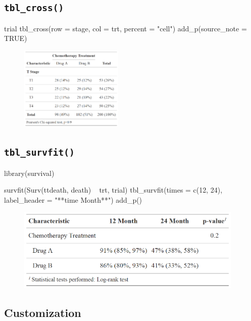 \subsection{\texorpdfstring{\texttt{tbl\_cross()}}{tbl\_cross()}}

\begin{example}
trial %
  tbl_cross(row = stage, col = trt, percent = "cell") %
  add_p(source_note = TRUE)
\end{example}
\begin{figure}[h!]
  \includegraphics[height=4cm]{cross.png}
  \centering
\end{figure}

\subsection{\texorpdfstring{\texttt{tbl\_survfit()}}{tbl\_survfit()}}

\begin{example}
library(survival)

survfit(Surv(ttdeath, death) ~ trt, trial) %
  tbl_survfit(times = c(12, 24),
              label_header = "**{time} Month**") %
  add_p()
\end{example}

\begin{figure}[h!]
  \includegraphics[height=4cm]{survfit.png}
  \centering
\end{figure}

\subsection{Customization}


